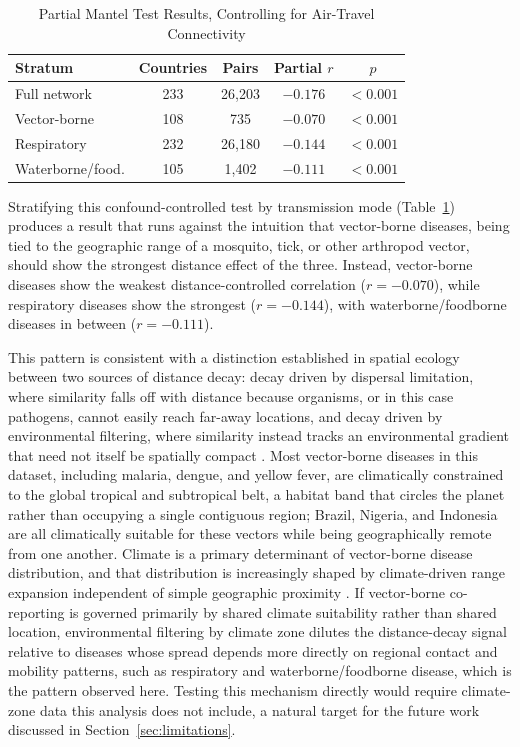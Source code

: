 \documentclass[11pt]{article}
\begin{document}
\begin{table}[H]
\centering
\caption{Partial Mantel Test Results, Controlling for Air-Travel Connectivity}
\label{tab:partial}
\begin{tabular}{lcccc}
\toprule
Stratum & Countries & Pairs & Partial $r$ & $p$ \\
\midrule
Full network & 233 & 26{,}203 & $-0.176$ & $<0.001$ \\
Vector-borne & 108 & 735 & $-0.070$ & $<0.001$ \\
Respiratory & 232 & 26{,}180 & $-0.144$ & $<0.001$ \\
Waterborne/food. & 105 & 1{,}402 & $-0.111$ & $<0.001$ \\
\bottomrule
\end{tabular}
\end{table}

Stratifying this confound-controlled test by transmission mode (Table~\ref{tab:partial})
produces a result that runs against the intuition that vector-borne diseases, being tied to
the geographic range of a mosquito, tick, or other arthropod vector, should show the
strongest distance effect of the three. Instead, vector-borne diseases show the weakest
distance-controlled correlation ($r=-0.070$), while respiratory diseases show the strongest
($r=-0.144$), with waterborne/foodborne diseases in between ($r=-0.111$).

This pattern is consistent with a distinction established in spatial ecology between two
sources of distance decay: decay driven by dispersal limitation, where similarity falls off
with distance because organisms, or in this case pathogens, cannot easily reach far-away
locations, and decay driven by environmental filtering, where similarity instead tracks an
environmental gradient that need not itself be spatially compact \cite{nekola1999}. Most
vector-borne diseases in this dataset, including malaria, dengue, and yellow fever, are
climatically constrained to the global tropical and subtropical belt, a habitat band that
circles the planet rather than occupying a single contiguous region; Brazil, Nigeria, and
Indonesia are all climatically suitable for these vectors while being geographically remote
from one another. Climate is a primary determinant of vector-borne disease distribution,
and that distribution is increasingly shaped by climate-driven range expansion independent
of simple geographic proximity \cite{paz2024}. If vector-borne co-reporting is governed
primarily by shared climate suitability rather than shared location, environmental
filtering by climate zone dilutes the distance-decay signal relative to diseases whose
spread depends more directly on regional contact and mobility patterns, such as respiratory
and waterborne/foodborne disease, which is the pattern observed here. Testing this mechanism
directly would require climate-zone data this analysis does not include, a natural target
for the future work discussed in Section~\ref{sec:limitations}.
\end{document}
